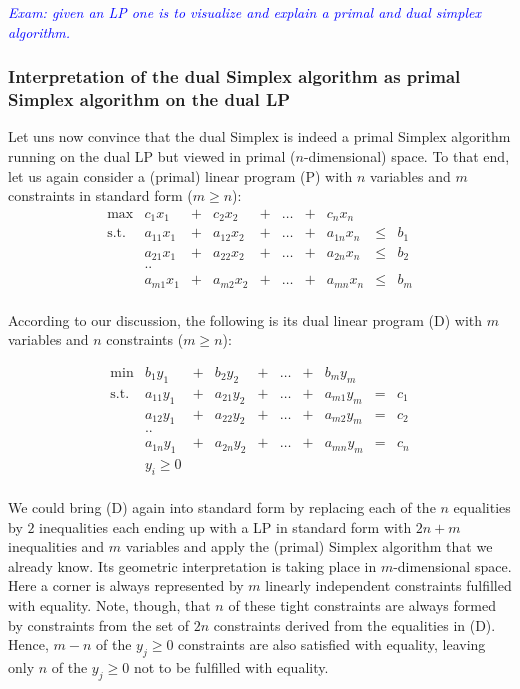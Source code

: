 \documentclass{article}
\begin{document}
\textcolor{blue}{\emph{Exam: given an LP one is to visualize and explain a primal and dual simplex algorithm.}}

\subsubsection{Interpretation of the dual Simplex algorithm as primal Simplex algorithm on the dual LP}
Let uns now convince that the dual Simplex is indeed a primal Simplex algorithm running on the dual LP but viewed in primal ($n$-dimensional) space. To that end, let us again consider a (primal) linear program (P) with $n$ variables and $m$ constraints in standard form ($m\geq n$): 	
\[
\begin{matrix}
	\max	& c_1 x_1 &+& c_2 x_2 &+& \dots &+& c_n x_n&&\\  
	\mbox{s.t.}	& a_{11} x_1 &+& a_{12} x_2&+& \dots &+&a_{1n} x_n&\leq&b_1\\
			& a_{21} x_1 &+& a_{22} x_2&+& \dots &+&a_{2n} x_n&\leq&b_2\\
			& ..	&&&&&&&&\\
			& a_{m1} x_1 &+& a_{m2} x_2&+& \dots &+&a_{mn} x_n&\leq&b_m\\
\end{matrix}
\]

According to our discussion, the following is its dual linear program (D) with $m$ variables and $n$ constraints ($m\geq n$): 

\[
\begin{matrix}
	\min& b_1 y_1 &+& b_2 y_2 &+& \dots &+& b_m y_m&&\\  
	\mbox{s.t.}	& a_{11} y_1 &+& a_{21} y_2&+& \dots &+&a_{m1} y_m&=&c_1\\
			& a_{12} y_1 &+& a_{22} y_2&+& \dots &+&a_{m2} y_m&=&c_2\\
			& ..	&&&&&&&&\\
			& a_{1n} y_1 &+& a_{2n} y_2&+& \dots &+&a_{mn} y_m&=&c_n\\
			& y_i\geq 0\\
\end{matrix}
\]

We could bring (D) again into standard form  by replacing each of the $n$ equalities by $2$ inequalities each ending up with a LP in standard form with  $2n+m$ inequalities and $m$ variables and apply the (primal) Simplex algorithm that we already know. Its geometric interpretation is taking place in $m$-dimensional space. Here a corner is always represented by $m$ linearly independent constraints fulfilled with equality. Note, though, that $n$ of these tight constraints are always formed by constraints from the set of $2n$ constraints derived from the equalities in (D). Hence, $m-n$ of the $y_j\geq 0$ constraints are also satisfied with equality, leaving only $n$ of the $y_j\geq 0$ not to be fulfilled with equality.
\end{document}
